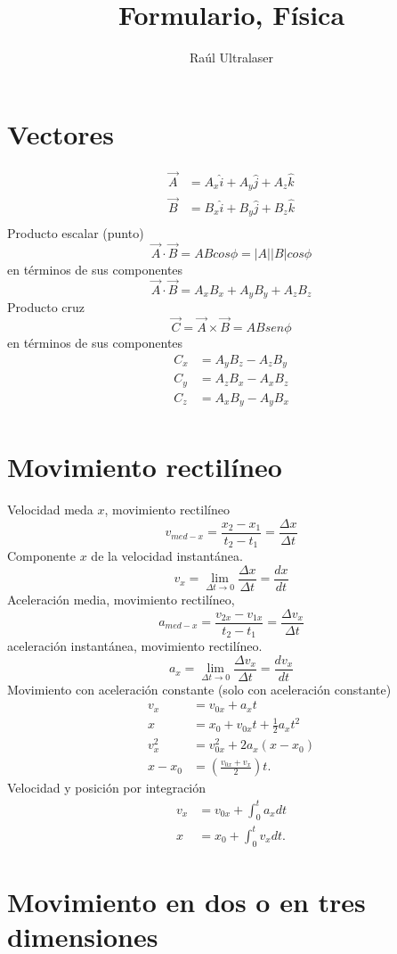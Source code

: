 \documentclass[twocolumn]{article}
\title{Formulario, Física}
\author{Raúl Ultralaser}
\date{}
\begin{document}
\maketitle

\section{Vectores}
\begin{align*}
\vec{A}&=A_x\hat{i}+A_y\hat{j}+A_z\hat{k}\\
\vec{B}&=B_x\hat{i}+B_y\hat{j}+B_z\hat{k}\\
\end{align*}
Producto escalar (punto)
\begin{equation*}
    \Vec{A}\cdot \Vec{B}=ABcos\phi=|A||B|cos\phi
\end{equation*}
en términos de sus componentes
\begin{equation*}
    \Vec{A}\cdot \Vec{B}=A_xB_x+A_yB_y+A_zB_z
\end{equation*}
Producto cruz
\begin{equation*}
    \Vec{C}=\Vec{A}\times\Vec{B}=ABsen\phi
\end{equation*}
en términos de sus componentes
\begin{align*}
C_x&=A_yB_z-A_zB_y\\
C_y&=A_zB_x-A_xB_z\\
C_z&=A_xB_y-A_yB_x\\
\end{align*}
\section{Movimiento rectilíneo}

Velocidad meda $x$, movimiento rectilíneo
\begin{equation*}
    v_{med-x}=\frac{x_2-x_1}{t_2-t_1}=\frac{\Delta x}{\Delta t}
\end{equation*}
Componente $x$ de la velocidad instantánea.
\begin{equation*}
    v_x=\lim_{\Delta t\rightarrow 0}\frac{\Delta x}{\Delta t}=\frac{dx}{dt}
\end{equation*}
Aceleración media, movimiento rectilíneo,
\begin{equation*}
    a_{med-x}=\frac{v_{2x}-v_{1x}}{t_2-t_1}=\frac{\Delta v_x}{\Delta t}
\end{equation*}
aceleración instantánea, movimiento rectilíneo.
\begin{equation*}
    a_x=\lim_{\Delta t\rightarrow 0}\frac{\Delta v_x}{\Delta t}=\frac{dv_x}{dt}
\end{equation*}
Movimiento con aceleración constante (solo con aceleración constante)
\begin{align*}
    v_x&=v_{0x}+a_xt\\
    x&=x_0+v_{0x}t+\frac{1}{2}a_xt^2\\
    v_x^2&=v^2_{0x}+2a_x(x-x_0)\\
    x-x_0&=\left( \frac{v_{0x}+v_x}{2} \right)t.
\end{align*}
Velocidad y posición por integración
\begin{align*}
    v_x&=v_{0x}+\int_0^ta_xdt\\
    x&=x_0+\int_0^tv_xdt.
\end{align*}
\section{Movimiento en dos o en  tres  dimensiones}
\end{document}

